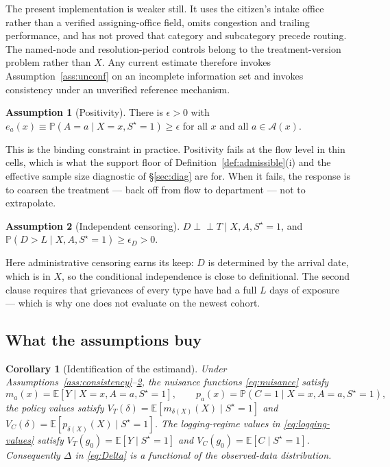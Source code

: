 \documentclass[11pt,a4paper]{article}
\theoremstyle{plain}
\newtheorem{corollary}[theorem]{Corollary}
\theoremstyle{definition}
\newtheorem{assumption}{Assumption}
\theoremstyle{remark}
\newcommand{\E}{\mathbb E}
\newcommand{\Prob}{\mathbb P}
\newcommand{\indep}{\perp\!\!\!\perp}
\newcommand{\Sstar}{S^{\star}}
\begin{document}
The present implementation is weaker still. It uses the citizen's intake office rather than a
verified assigning-office field, omits congestion and trailing performance, and has not proved
that category and subcategory precede routing. The named-node and resolution-period controls
belong to the treatment-version problem rather than $X$. Any current estimate therefore invokes
Assumption~\ref{ass:unconf} on an incomplete information set and invokes consistency under an
unverified reference mechanism.

\begin{assumption}[Positivity]\label{ass:positivity}
There is $\epsilon>0$ with $e_a(x)\equiv\Prob(A=a\mid X=x,\Sstar=1)\ge\epsilon$ for all $x$ and all
$a\in\mathcal A(x)$.
\end{assumption}

This is the binding constraint in practice. Positivity fails at the flow level in thin cells,
which is what the support floor of Definition~\ref{def:admissible}(i) and the effective sample
size diagnostic of \S\ref{sec:diag} are for. When it fails, the response is to coarsen the
treatment --- back off from flow to department --- not to extrapolate.

\begin{assumption}[Independent censoring]\label{ass:censor}
$D\indep T\mid X,A,\Sstar=1$, and $\Prob(D>L\mid X,A,\Sstar=1)\ge\epsilon_D>0$.
\end{assumption}

Here administrative censoring earns its keep: $D$ is determined by the arrival date, which is in
$X$, so the conditional independence is close to definitional. The second clause requires that
grievances of every type have had a full $L$ days of exposure --- which is why one does not
evaluate on the newest cohort.

\subsection{What the assumptions buy}

\begin{corollary}[Identification of the estimand]\label{cor:identified}
Under Assumptions~\ref{ass:consistency}--\ref{ass:censor}, the nuisance functions
\eqref{eq:nuisance} satisfy
\[
m_a(x)=\E[Y\mid X=x,A=a,\Sstar=1],
\qquad
p_a(x)=\Prob(C=1\mid X=x,A=a,\Sstar=1),
\]
the policy values satisfy $V_T(\delta)=\E[m_{\delta(X)}(X)\mid \Sstar=1]$ and
$V_C(\delta)=\E[p_{\delta(X)}(X)\mid \Sstar=1]$. The logging-regime values in
\eqref{eq:logging-values} satisfy
$V_T(g_0)=\E[Y\mid\Sstar=1]$ and $V_C(g_0)=\E[C\mid\Sstar=1]$. Consequently $\Delta$ in
\eqref{eq:Delta} is a functional of the observed-data distribution.
\end{corollary}
\end{document}
